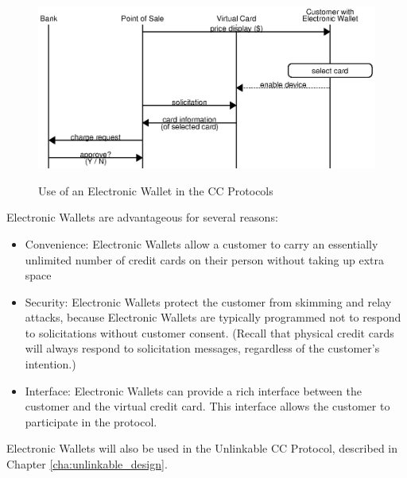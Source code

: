 \begin{figure}[h!]
  \caption{Use of an Electronic Wallet in the CC Protocols}
  \centering
    \includegraphics{img/wallet.eps}
  \label{fig:wallet}
\end{figure}

Electronic Wallets are advantageous for several reasons:
\begin{itemize}
\item Convenience: Electronic Wallets allow a customer to carry an essentially unlimited number of credit cards on their person without taking up extra space
\item Security: Electronic Wallets protect the customer from skimming and relay attacks,
    because Electronic Wallets are typically programmed not to respond to solicitations without customer consent.
    (Recall that physical credit cards will always respond to solicitation messages, regardless of the customer's intention.)
\item Interface: Electronic Wallets can provide a rich interface between the customer and the virtual credit card.
    This interface allows the customer to participate in the protocol.
\end{itemize}

Electronic Wallets will also be used in the Unlinkable CC Protocol, described in Chapter \ref{cha:unlinkable_design}.